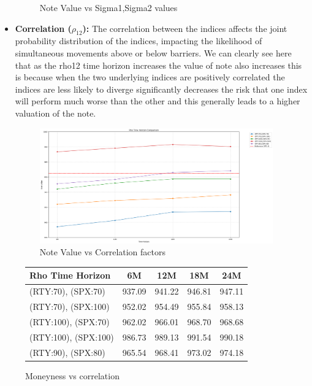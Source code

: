 \documentclass[12pt,a4paper]{article}
\begin{document}
\begin{itemize}
\begin{figure}[H]
	    \caption{Note Value vs Sigma1,Sigma2 values}
	    \label{fig:yourlabel}
	\end{figure}
    \item \textbf{Correlation (\( \rho_{12} \)):} The correlation between the indices affects the joint probability distribution of the indices, impacting the likelihood of simultaneous movements above or below barriers. We can clearly see here that as the rho12 time horizon increases the value of note also increases this is because when the two underlying indices are positively correlated the indices are less likely to diverge significantly decreases the risk that one index will perform much worse than the other and this generally leads to a higher valuation of the note.
	\begin{figure}[H]
	    \centering
	    \includegraphics[width=0.95\textwidth, keepaspectratio]{images_project_3/note_val_rho.png}
	    \caption{Note Value vs Correlation factors}
	    \label{fig:yourlabel}
	\end{figure}
\end{itemize}

\begin{figure}[htbp]
\centering
\renewcommand{\arraystretch}{1.2}  %
\setlength{\tabcolsep}{15pt}      %
\begin{tabular}{|l|r|r|r|r|}
\hline
\rowcolor{cyan!15}\bf Rho Time Horizon & \multicolumn{1}{c|}{\bf 6M} & \multicolumn{1}{c|}{\bf 12M} & \multicolumn{1}{c|}{\bf 18M} & \multicolumn{1}{c|}{\bf 24M} \\
\hline
(RTY:70), (SPX:70) & 937.09 & 941.22 & 946.81 & 947.11 \\
\hline
(RTY:70), (SPX:100) & 952.02 & 954.49 & 955.84 & 958.13 \\
\hline
(RTY:100), (SPX:70) & 962.02 & 966.01 & 968.70 & 968.68 \\
\hline
(RTY:100), (SPX:100) & 986.73 & 989.13 & 991.54 & 990.18 \\
\hline
(RTY:90), (SPX:80) & 965.54 & 968.41 & 973.02 & 974.18 \\
\hline
\end{tabular}
\caption{Moneyness vs correlation}
\label{fig:moneyness_correlation}
\end{figure}
\end{document}
